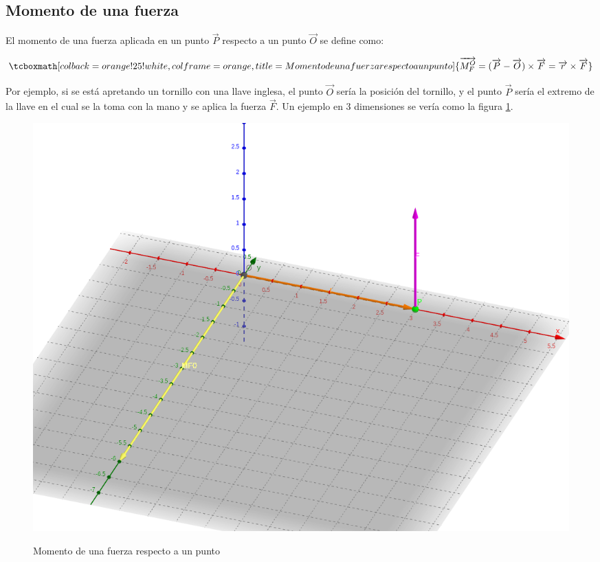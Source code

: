 \documentclass{article}
\begin{document}
\subsection{Momento de una fuerza}

El momento de una fuerza aplicada en un punto $\overrightarrow{P}$ respecto a un punto $\overrightarrow{O}$ se define como:

\begin{equation}
\tcboxmath[colback=orange!25!white,colframe=orange,title=Momento de una fuerza respecto a un punto]{
\overrightarrow{M_{F}^{O}} = (\overrightarrow{P}-\overrightarrow{O}) \times \overrightarrow{F} = \overrightarrow{r} \times \overrightarrow{F}
}
\end{equation}

Por ejemplo, si se está apretando un tornillo con una llave inglesa, el punto $\overrightarrow{O}$ sería la posición del tornillo, y el punto $\overrightarrow{P}$ sería el extremo de la llave en el cual se la toma con la mano y se aplica la fuerza $\overrightarrow{F}$. Un ejemplo en 3 dimensiones se vería como la figura \ref{fig:torque-01}.

\begin{figure}[ht]
\centering
\caption{Momento de una fuerza respecto a un punto}
\includegraphics[scale=0.45]{../../common/img/62.01/theory/16-dynamics-torque-01.png}
\label{fig:torque-01}
\end{figure}
\end{document}
